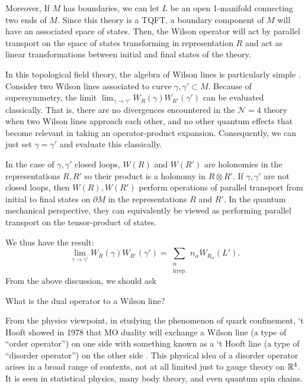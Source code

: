 	Moreover, If $M$ has boundaries, we can let $L$ be an open 1-manifold connecting two ends of $M$. Since this theory is a TQFT, a boundary component of $M$ will have an associated space of states. Then, the Wilson operator will act by parallel transport on the space of states transforming in representation $R$ and act as linear transformations between initial and final states of the theory. 
	
	In this topological field theory, the algebra of Wilson lines is particularly simple \cite{kapustin2006}. Consider two Wilson lines associated to curve $\gamma, \gamma' \subset M$. Because of supersymmetry, the limit $\lim_{\gamma \to \gamma'} W_R (\gamma) W_{R'} (\gamma')$ can be evaluated classically. That is, there are no divergences encountered in the $\mathcal N=4$ theory when two Wilson lines approach each other, and no other quantum effects that become relevant in taking an operator-product expansion. Consequently, we can just set $\gamma= \gamma'$ and evaluate this classically. 
	
	In the case of $\gamma, \gamma'$ closed loops, $W(R)$ and $W(R')$ are holonomies in the representations $R, R'$ so their product is a holonomy in $R \otimes R'$. If $\gamma, \gamma'$ are not closed loops, then $W(R), W(R')$ perform operations of parallel transport from initial to final states on $\partial M$ in the representations $R$ and $R'$. In the  quantum mechanical perspective, they can equivalently be viewed as performing parallel transport on the tensor-product of states. 
	
	We thus have the result:
		\begin{equation}
			\lim_{\gamma \to \gamma'} W_R (\gamma) W_{R'} (\gamma') = \sum_{\substack{\alpha \\\text{irrep.}}} n_\alpha W_{R_\alpha}(L').
		\end{equation}
	From the above discussion, we should ask 
	\begin{ques}
		What is the dual operator to a Wilson line?
	\end{ques}
	From the physics viewpoint, in studying the phenomenon of quark confinement, `t Hooft showed in 1978 that MO duality will exchange a Wilson line (a type of ``order operator'') on one side with something known as a `t Hooft line (a type of ``disorder operator'') on the other side \cite{hooft1978}. This physical idea of a disorder operator arises in a broad range of contexts, not at all limited just to gauge theory on $\mathbb{R}^4$. It is seen in statistical physics, many body theory, and even quantum spin chains.
	
